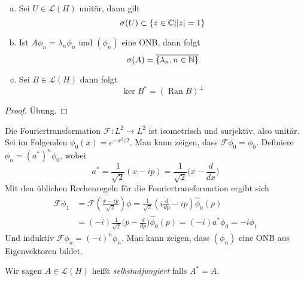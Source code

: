 \documentclass{mycourse}
\newcommand{\Ran}{\operatorname{Ran}}
\begin{document}
\begin{prop}
\begin{enumerate}[a)]
\item Sei $U\in \mathcal L(H)$ unitär, dann gilt
\[
	\sigma(U) \subset \{z\in \mathbb{C}| |z|=1\}
\]
\item Ist $A\phi_n=\lambda_n\phi_n$ und $(\phi_n)$ eine ONB, dann folgt
\[
\sigma(A)=\overline{\{\lambda_n, n\in \mathbb{N}\}}
\]
\item Sei $B\in \mathcal L(H)$ dann folgt
\[
\ker B^*=(\Ran B)^\perp
\]
\end{enumerate}
\end{prop}

\begin{proof}
Übung.
\end{proof}

\begin{ex*}
Die Fouriertransformation $\mathcal F: L^2 \to L^2$ ist isometrisch und surjektiv, also unitär. Sei im Folgenden $\phi_0(x)=e^{-x^2/2}$. Man kann zeigen, dass $\mathcal F \phi_0 = \phi_0$. Definiere $\phi_n = (a^*)^n \phi_0$, wobei 
\[
a^*=\frac{1}{\sqrt{2}} (x-ip) = \frac{1}{\sqrt{2}} \big( x- \frac{d}{dx}\big)
\]
Mit den üblichen Rechenregeln für die Fouriertransformation ergibt sich
\begin{align*}
\mathcal F \phi_1 &= \mathcal F(\frac{x-ip}{\sqrt{2}}) \phi = \frac{1}{\sqrt{2}} (i \frac{d}{dp} - ip) \hat \phi_0 (p)\\
&= (-i) \frac{1}{\sqrt{2}} \big(p-\frac{d}{dp}\big) \hat \phi_0(p) =(-i) a^* \phi_0=-i \phi_1
\end{align*}
Und induktiv $\mathcal F \phi_n = (-i)^n \phi_n$. Man kann zeigen, dass $(\phi_n)$ eine ONB aus Eigenvektoren bildet. 
\end{ex*}

\begin{df}
Wir sagen $A\in \mathcal L(H)$ heißt \emph{selbstadjungiert} falls $A^*=A$.
\end{df}
\end{document}
